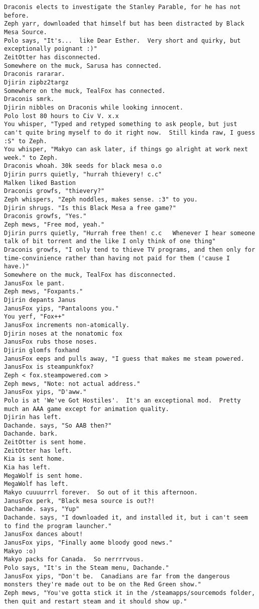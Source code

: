 \begin{verbatim}
Draconis elects to investigate the Stanley Parable, for he has not before.
Zeph yarr, downloaded that himself but has been distracted by Black Mesa Source.
Polo says, "It's...  like Dear Esther.  Very short and quirky, but exceptionally poignant :)"
ZeitOtter has disconnected.
Somewhere on the muck, Sarusa has connected.
Draconis rararar.
Djirin zipbz2targz
Somewhere on the muck, TealFox has connected.
Draconis smrk.
Djirin nibbles on Draconis while looking innocent.
Polo lost 80 hours to Civ V. x.x
You whisper, "Typed and retyped something to ask people, but just can't quite bring myself to do it right now.  Still kinda raw, I guess :S" to Zeph.
You whisper, "Makyo can ask later, if things go alright at work next week." to Zeph.
Draconis whoah. 30k seeds for black mesa o.o
Djirin purrs quietly, "hurrah thievery! c.c"
Malken liked Bastion
Draconis growfs, "thievery?"
Zeph whispers, "Zeph noddles, makes sense. :3" to you.
Djirin shrugs. "Is this Black Mesa a free game?"
Draconis growfs, "Yes."
Zeph mews, "Free mod, yeah."
Djirin purrs quietly, "Hurrah free then! c.c   Whenever I hear someone talk of bit torrent and the like I only think of one thing"
Draconis growfs, "I only tend to thieve TV programs, and then only for time-convinience rather than having not paid for them ('cause I have.)"
Somewhere on the muck, TealFox has disconnected.
JanusFox le pant.
Zeph mews, "Foxpants."
Djirin depants Janus
JanusFox yips, "Pantaloons you."
You yerf, "Fox++"
JanusFox increments non-atomically.
Djirin noses at the nonatomic fox
JanusFox rubs those noses.
Djirin glomfs foxhand
JanusFox eeps and pulls away, "I guess that makes me steam powered.
JanusFox is steampunkfox?
Zeph < fox.steampowered.com >
Zeph mews, "Note: not actual address."
JanusFox yips, "D'aww."
Polo is at 'We've Got Hostiles'.  It's an exceptional mod.  Pretty much an AAA game except for animation quality.
Djirin has left.
Dachande. says, "So AAB then?"
Dachande. bark.
ZeitOtter is sent home.
ZeitOtter has left.
Kia is sent home.
Kia has left.
MegaWolf is sent home.
MegaWolf has left.
Makyo cuuuurrrl forever.  So out of it this afternoon.
JanusFox perk, "Black mesa source is out?!
Dachande. says, "Yup"
Dachande. says, "I downloaded it, and installed it, but i can't seem to find the program launcher."
JanusFox dances about!
JanusFox yips, "Finally aome bloody good news."
Makyo :o)
Makyo packs for Canada.  So nerrrrvous.
Polo says, "It's in the Steam menu, Dachande."
JanusFox yips, "Don't be.  Canadians are far from the dangerous monsters they're made out to be on the Red Green show."
Zeph mews, "You've gotta stick it in the /steamapps/sourcemods folder, then quit and restart steam and it should show up."

\end{verbatim}
